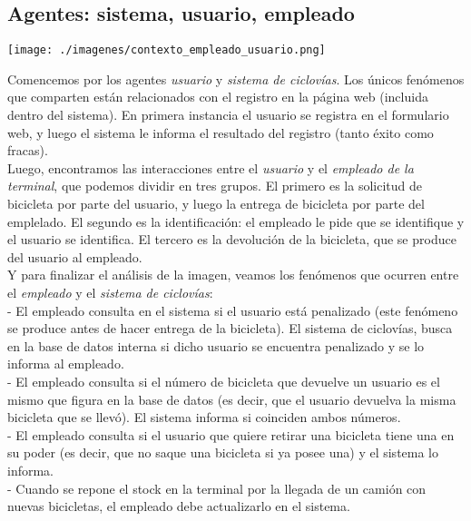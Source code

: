 \documentclass[a4paper, 11pt, spanish]{article}
\begin{document}
\subsection{Agentes: sistema, usuario, empleado}

\centerline{\texttt{[image: ./imagenes/contexto\_empleado\_usuario.png]}}
 
 
Comencemos por los agentes \textit{usuario} y \textit{sistema de ciclovías}. Los únicos fenómenos que comparten están relacionados con el registro en la página web (incluida dentro del sistema). En primera instancia el usuario se registra en el formulario web, y luego el sistema le informa el resultado del registro (tanto éxito como fracas).\\
 
Luego, encontramos las interacciones entre el \textit{usuario} y el \textit{empleado de la terminal}, que podemos dividir en tres grupos. El primero es la solicitud de bicicleta por parte del usuario, y luego la entrega de bicicleta por parte del emplelado. El segundo es la identificación: el empleado le pide que se identifique y el usuario se identifica. El tercero es la devolución de la bicicleta, que se produce del usuario al empleado.\\

Y para finalizar el análisis de la imagen, veamos los fenómenos que ocurren entre el \textit{empleado} y el \textit{sistema de ciclovías}:\\

- El empleado consulta en el sistema si el usuario está penalizado (este fenómeno se produce antes de hacer entrega de la bicicleta). El sistema de ciclovías, busca en la base de datos interna si dicho usuario se encuentra penalizado y se lo informa al empleado.\\

- El empleado consulta si el número de bicicleta que devuelve un usuario es el mismo que figura en la base de datos (es decir, que el usuario devuelva la misma bicicleta que se llevó). El sistema informa si coinciden ambos números.\\

- El empleado consulta si el usuario que quiere retirar una bicicleta tiene una en su poder (es decir, que no saque una bicicleta si ya posee una) y el sistema lo informa.\\

- Cuando se repone el stock en la terminal por la llegada de un camión con nuevas bicicletas, el empleado debe actualizarlo en el sistema.\\
\end{document}
